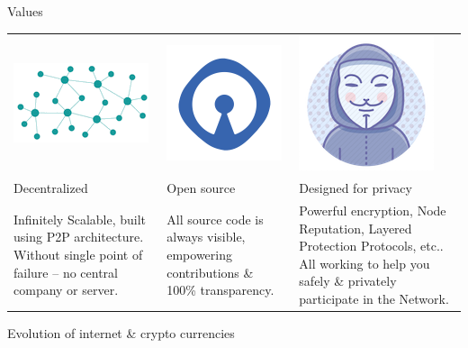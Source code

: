 \documentclass[10pt]{beamer}
\begin{document}
\begin{frame}[t]{Values}
\centering
\begin{adjustbox}{width=1\textwidth}
\begin{tabularx} {\textwidth}{|Y|Y|Y|}
    \hline
  \includegraphics[scale=0.3]{static/decentnew} & \includegraphics[scale=0.3]{static/opensource} & \includegraphics[scale=0.3]{static/privacy}\\  
Decentralized & Open source & Designed for privacy\\
Infinitely Scalable, built using P2P architecture. Without single point of failure – no central company or server.   &  All source code is always visible, empowering contributions \& 100\% transparency. & Powerful encryption, Node Reputation, Layered Protection Protocols, etc.. All working to help you safely \& privately participate in the Network.  \\
    \hline
\end{tabularx}
\end{adjustbox}

\end{frame}
    

\begin{frame}[t]{Evolution of internet \& crypto currencies}
    
    
\end{frame}    
    
\end{document}

